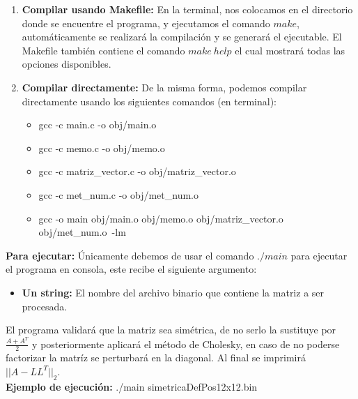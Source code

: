 \documentclass[12pt]{article}
\begin{document}
\begin{enumerate}
	\item \textbf{Compilar usando Makefile:} En la terminal, nos colocamos en el directorio donde se encuentre el programa, y ejecutamos el comando $make$, automáticamente se realizará la compilación y se generará el ejecutable. El Makefile también contiene el comando $make\ help$ el cual mostrará todas las opciones disponibles.
	\item \textbf{Compilar directamente:} De la misma forma, podemos compilar directamente usando los siguientes comandos (en terminal):
	\begin{itemize}
		\item gcc -c main.c -o obj/main.o
		\item gcc -c memo.c -o obj/memo.o
		\item gcc -c matriz\_vector.c -o obj/matriz\_vector.o
		\item gcc -c met\_num.c -o obj/met\_num.o
		\item gcc -o main obj/main.o obj/memo.o obj/matriz\_vector.o obj/met\_num.o\ -lm
	\end{itemize}
\end{enumerate}

\textbf{Para ejecutar:} Únicamente debemos de usar el comando $./main$ para ejecutar el programa en consola, este recibe el siguiente argumento:
\begin{itemize}
	\item \textbf{Un string:} El nombre del archivo binario que contiene la matriz a ser procesada.
\end{itemize}

El programa validará que la matriz sea simétrica, de no serlo la sustituye por $\frac{A + A^T}{2}$ y posteriormente aplicará el método de Cholesky, en caso de no poderse factorizar la matríz se perturbará en la diagonal. Al final se imprimirá $||A - LL^T||_2$.\\

\textbf{Ejemplo de ejecución:} ./main simetricaDefPos12x12.bin\\
\end{document}
